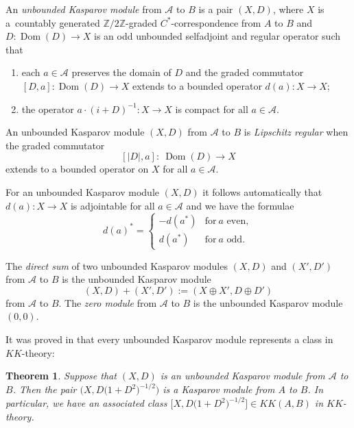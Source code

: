 \documentclass[11pt]{article}
\numberwithin{equation}{section}
\newtheorem{Theorem}{Theorem}[section]
\newcommand{\cd}{\cdot}
\newcommand{\op}{\oplus}
\newcommand{\zz}{\mathbb{Z}}
\newcommand{\s}[1]{\mathscr{#1}}
\begin{document}
\begin{dfn}\label{d:unbkas}
An \emph{unbounded Kasparov module} from $\s A$ to $B$ is a pair $(X,D)$, where $X$ is a~countably generated $\zz/2\zz$-graded $C^*$-correspondence from $A$ to $B$ and $D \colon \operatorname{Dom}(D) \to X$ is an odd unbounded selfadjoint and regular operator such that
\begin{enumerate}\itemsep=0pt
\item[1)] each $a \in \s A$ preserves the domain of $D$ and the graded commutator $[D,a]\colon \operatorname{Dom}(D) \to X$ extends to a bounded operator $d(a)\colon X \to X$;
\item[2)] the operator $a \cd (i + D)^{-1}\colon X \to X$ is compact for all $a \in \s A$.
\end{enumerate}

An unbounded Kasparov module $(X,D)$ from $\s A$ to $B$ is \emph{Lipschitz regular} when the graded commutator
\[
[|D|,a] \colon \ \operatorname{Dom}(D) \to X
\]
extends to a bounded operator on $X$ for all $a \in \s A$.
\end{dfn}

For an unbounded Kasparov module $(X,D)$ it follows automatically that $d(a)\colon X \to X$ is adjointable for all $a \in \s A$ and we have the formulae
\[
d(a)^* = \begin{cases} - d(a^*) & \text{for} \ a \text{ even}, \\ d(a^*) & \text{for} \ a \text{ odd}.\end{cases}
\]

\begin{dfn}\label{d:dirsum}
The \emph{direct sum} of two unbounded Kasparov modules $(X,D)$ and $(X', D')$ from $\s A$ to $B$ is the unbounded Kasparov module
\[
(X, D) + (X', D') := (X \op X', D \op D')
\]
from $\s A$ to $B$. The \emph{zero module} from $\s A$ to $B$ is the unbounded Kasparov module $(0,0)$.
\end{dfn}


It was proved in \cite{BaJu:TBK} that every unbounded Kasparov module represents a class in $KK$-theory:

\begin{Theorem}
Suppose that $(X,D)$ is an unbounded Kasparov module from $\s A$ to $B$. Then the pair $\big(X, D\big(1 + D^2\big)^{-1/2}\big)$ is a Kasparov module from $A$ to $B$. In particular, we have an associated class $\big[X, D\big(1 + D^2\big)^{-1/2}\big] \in KK(A,B)$ in $KK$-theory.
\end{Theorem}
\end{document}
